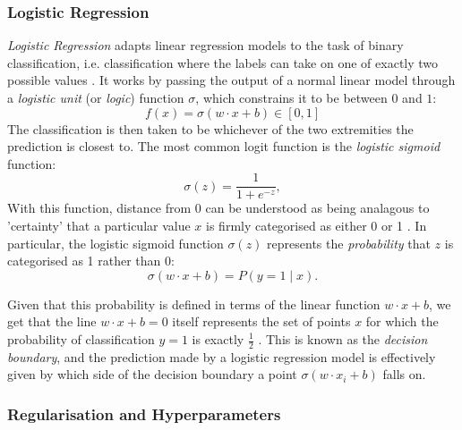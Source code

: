 \documentclass{report}
\begin{document}
\subsubsection{Logistic Regression}

\textit{Logistic Regression} adapts linear regression models to the task of binary classification, i.e. classification where the labels can take on one of exactly two possible values \cite{hastie2009elements}. It works by passing the output of a normal linear model through a \textit{logistic unit} (or \textit{logic}) function $\sigma$, which constrains it to be between $0$ and $1$:
\begin{equation}
f(x) = \sigma(w \cdot x + b) \in [0, 1]
\end{equation}
The classification is then taken to be whichever of the two extremities the prediction is closest to. The most common logit function is the \textit{logistic sigmoid} function:
\begin{equation}
\sigma(z) = \frac{1}{1 + e^{-z}},
\end{equation}
With this function, distance from 0 can be understood as being analagous to 'certainty' that a particular value $x$ is firmly categorised as either 0 or 1 \cite{hastie2009elements}. In particular, the logistic sigmoid function $\sigma(z)$ represents the \textit{probability} that $z$ is categorised as 1 rather than 0:
\begin{equation}
\sigma(w \cdot x + b) = P(y=1 \; | \; x).
\end{equation}

Given that this probability is defined in terms of the linear function $w \cdot x + b$, we get that the line $w \cdot x + b = 0$ itself represents the set of points $x$ for which the probability of classification $y=1$ is exactly $\frac{1}{2}$ \cite{hastie2009elements}. This is known as the \textit{decision boundary}, and the prediction made by a logistic regression model is effectively given by which side of the decision boundary a point $\sigma(w \cdot x_i + b)$ falls on.


\subsubsection{Regularisation and Hyperparameters}
\end{document}
